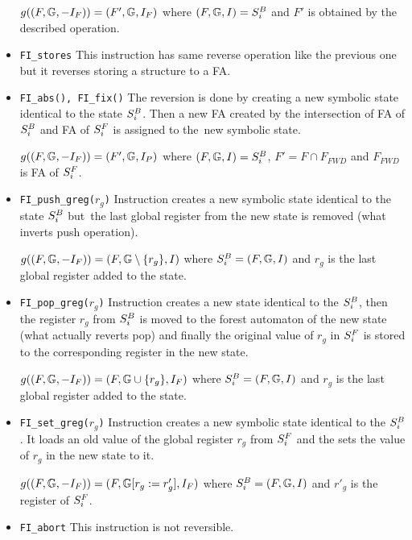 \begin{itemize}
		$g((F, \mathbb{G}, -I_{F})) = (F', \mathbb{G}, I_{F})$
			where $(F, \mathbb{G}, I) = S^{B}_{i}$ and $F'$ is obtained
			by the described operation.

	
	\item {\tt FI\_stores}
		This instruction has same reverse operation like the previous one but
		it reverses storing a structure to a FA.

	\item {\tt FI\_abs(), FI\_fix()}
		The reversion is done by creating a new symbolic state identical to the state $S^{B}_{i}$.
		Then a new FA created by the intersection of FA of $S^{B}_{i}$ and FA of $S^{F}_{i}$ is assigned
		to the~new symbolic state.

		$g((F, \mathbb{G}, -I_{F})) = (F', \mathbb{G}, I_{P})$
			where $(F, \mathbb{G}, I) = S^{B}_{i}$, $F' = F \cap F_{FWD}$ and $F_{FWD}$ is
			FA of $S^{F}_{i}$.

	\item {\tt FI\_push\_greg($r_g$)}
		Instruction creates a new symbolic state identical to the state $S^{B}_{i}$ but~the
		last global register from the new state is removed (what inverts push operation).

		$g((F, \mathbb{G}, -I_{F})) = (F, \mathbb{G} \setminus \{r_g\}, I)$ where $S^{B}_{i} = (F, \mathbb{G}, I)$ and $r_g$
		is the last global register added to the state.

	\item {\tt FI\_pop\_greg($r_g$)}
		Instruction creates a new state identical to the $S^{B}_{i}$,
		then the register $r_g$ from $S^{B}_{i}$ is moved to the
		forest automaton of the new state (what actually reverts pop)
		and finally the original value of $r_g$ in $S^{F}_{i}$ is stored
		to the corresponding register in the new state.
	
		$g((F, \mathbb{G}, -I_{F})) = (F, \mathbb{G} \cup \{r_g\}, I_{F})$ where $S^{B}_{i} = (F, \mathbb{G}, I)$ and $r_g$
		is the last global register added to the state.
	
	\item {\tt FI\_set\_greg($r_g$)}
		Instruction creates a new symbolic state identical to the $S^{B}_{i}$.
		It loads an old value of the global register $r_g$ from $S^{F}_{i}$
		and the sets the value of $r_g$ in the new state to it.

		$g((F, \mathbb{G}, -I_{F})) = (F, \mathbb{G} [r_{g} := r'_{g}]
		, I_{F})$ where $S^{B}_{i} = (F, \mathbb{G}, I)$ and $r'_{g}$
		is the register of $S^{F}_{i}$.

	\item {\tt FI\_abort}
		This instruction is not reversible.


\end{itemize}
